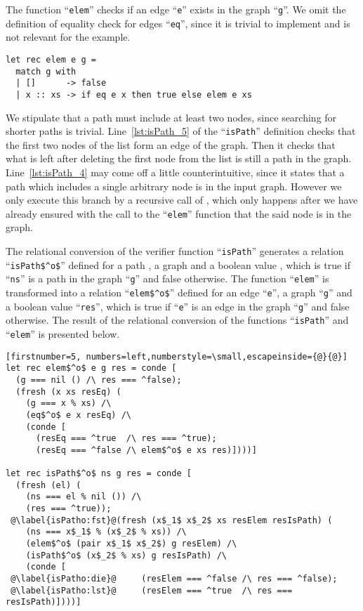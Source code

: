 The function ``\lstinline{elem}'' checks if an edge ``\lstinline{e}''  exists in the graph ``\lstinline{g}''. 
We omit the definition of equality check for edges ``\lstinline{eq}'', since it is trivial to implement and is not relevant for the example.

\begin{lstlisting}
let rec elem e g =
  match g with
  | []      -> false
  | x :: xs -> if eq e x then true else elem e xs
\end{lstlisting}

We stipulate that a path must include at least two nodes, since searching for shorter paths is trivial. 
Line~\ref{lst:isPath_5} of the ``\lstinline{isPath}'' definition checks that the first two nodes of the list form an edge of the graph. 
Then it checks that what is left after deleting the first node from the list is still a path in the graph.
Line~\ref{lst:isPath_4} may come off a little counterintuitive, since it states that a path which includes a single arbitrary node is in the input graph.
However we only execute this branch by a recursive call of , which only happens after we have already ensured with the call to the ``\lstinline{elem}'' function that the said node is in the graph. 

The relational conversion of the verifier function ``\lstinline{isPath}'' generates a relation ``\lstinline{isPath$^o$}'' defined for a path , a graph  and a boolean value , which is true if ``\lstinline{ns}'' is a path in the graph ``\lstinline{g}'' and false otherwise. 
The function ``\lstinline{elem}'' is transformed into a relation ``\lstinline{elem$^o$}'' defined for an edge ``\lstinline{e}'', a graph ``\lstinline{g}'' and a boolean value ``\lstinline{res}'', which is true if ``\lstinline{e}'' is an edge in the graph ``\lstinline{g}'' and false otherwise.
The result of the relational conversion of the functions ``\lstinline{isPath}'' and ``\lstinline{elem}'' is presented below.

\begin{lstlisting}[firstnumber=5, numbers=left,numberstyle=\small,escapeinside={@}{@}]
let rec elem$^o$ e g res = conde [
  (g === nil () /\ res === ^false);
  (fresh (x xs resEq) (
    (g === x % xs) /\ 
    (eq$^o$ e x resEq) /\ 
    (conde [
      (resEq === ^true  /\ res === ^true); 
      (resEq === ^false /\ elem$^o$ e xs res)])))]

let rec isPath$^o$ ns g res = conde [
  (fresh (el) (
    (ns === el % nil ()) /\ 
    (res === ^true));
 @\label{isPatho:fst}@(fresh (x$_1$ x$_2$ xs resElem resIsPath) (
    (ns === x$_1$ % (x$_2$ % xs)) /\ 
    (elem$^o$ (pair x$_1$ x$_2$) g resElem) /\
    (isPath$^o$ (x$_2$ % xs) g resIsPath) /\ 
    (conde [
 @\label{isPatho:die}@     (resElem === ^false /\ res === ^false); 
 @\label{isPatho:lst}@     (resElem === ^true  /\ res === resIsPath)])))]
\end{lstlisting}

